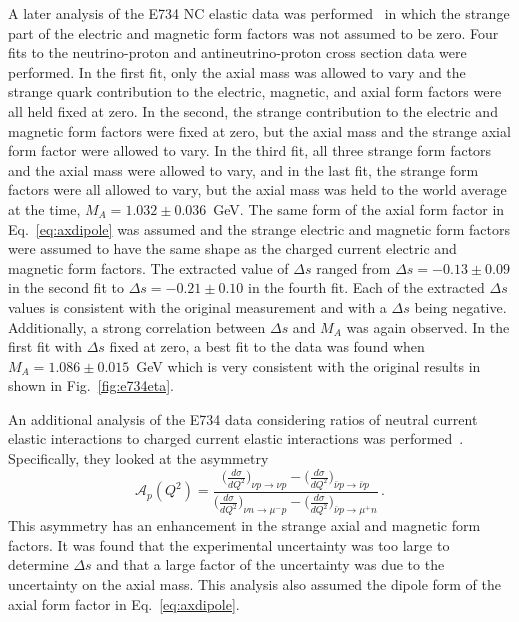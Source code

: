     A later analysis of the E734 NC elastic data was
    performed~\cite{Garvey:1992cg} in which the strange part of the electric
    and magnetic form factors was not assumed to be zero. Four fits to the
    neutrino-proton and antineutrino-proton cross section data were performed.
    In the first fit, only the axial mass was allowed to vary and the strange
    quark contribution to the electric, magnetic, and axial form factors were
    all held fixed at zero. In the second, the strange contribution to the
    electric and magnetic form factors were fixed at zero, but the axial mass
    and the strange axial form factor were allowed to vary. In the third fit,
    all three strange form factors and the axial mass were allowed to vary, and
    in the last fit, the strange form factors were all allowed to vary, but the
    axial mass was held to the world average at the time, $M_A =
    1.032\pm0.036$~GeV. The same form of the axial form factor in
    Eq.~\ref{eq:axdipole} was assumed and the strange electric and magnetic
    form factors were assumed to have the same shape as the charged current
    electric and magnetic form factors. The extracted value of $\Delta s$
    ranged from $\Delta s = -0.13 \pm 0.09$ in the second fit to $\Delta s =
    -0.21 \pm 0.10$ in the fourth fit.  Each of the extracted $\Delta s$ values
    is consistent with the original measurement and with a $\Delta s$ being
    negative.  Additionally, a strong correlation between $\Delta s$ and $M_A$
    was again observed. In the first fit with $\Delta s$ fixed at zero, a best
    fit to the data was found when $M_A = 1.086 \pm 0.015$~GeV which is very
    consistent with the original results in~\cite{Ahrens:1986xe} shown in
    Fig.~\ref{fig:e734eta}.

    An additional analysis of the E734 data considering ratios of neutral
    current elastic interactions to charged current elastic interactions was
    performed~\cite{Alberico:1998qw}. Specifically, they looked at the
    asymmetry
    \begin{equation*}
      \mathcal{A}_p(Q^2) = \frac{\Big(\frac{d\sigma}{dQ^2}\Big)_{\nu p \rightarrow \nu p} - \Big(\frac{d\sigma}{dQ^2}\Big)_{\bar{\nu} p \rightarrow \bar{\nu} p} }{\Big(\frac{d\sigma}{dQ^2}\Big)_{\nu n \rightarrow \mu^- p} - \Big(\frac{d\sigma}{dQ^2}\Big)_{\bar{\nu} p \rightarrow \mu^+ n}} \,.
    \end{equation*}
    This asymmetry has an enhancement in the strange axial and magnetic form
    factors. It was found that the experimental uncertainty was too large to
    determine $\Delta s$ and that a large factor of the uncertainty was due to
    the uncertainty on the axial mass. This analysis also assumed the dipole
    form of the axial form factor in Eq.~\ref{eq:axdipole}.


